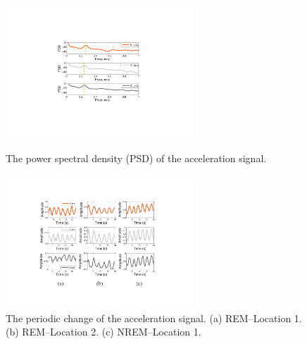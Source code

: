 \begin{figure}
	\centering
	\begin{minipage}[t]{.475\textwidth}
	\centering
\includegraphics[width=7cm,height=5cm]{Figures/PSD.pdf}
\caption{The power spectral density (PSD) of the acceleration signal.}\label{fig:PSD}
	\end{minipage}%
\hfill
	\begin{minipage}[t]{.475\textwidth}
	\centering
	\includegraphics[width=7cm,height=5cm]{Figures/breath_ok1.pdf}
	\caption{The periodic change of the acceleration signal. (a) REM--Location 1. (b) REM--Location 2.  (c) NREM--Location 1.}\label{fig:breath_ok1}
	\end{minipage}
\end{figure}


